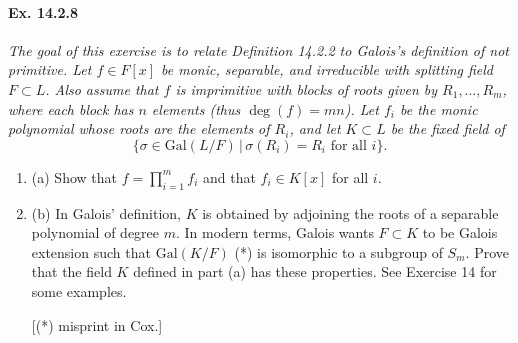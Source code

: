 \documentclass[11pt,a4paper]{article}
\newcommand{\be} {\begin{enumerate}}
\newcommand{\ee} {\end{enumerate}}
\newcommand{\Gal}{\mathrm{Gal}}
\begin{document}
\paragraph{Ex. 14.2.8}
{\it
The goal of this exercise is to relate Definition 14.2.2 to Galois's definition of not primitive. Let $f \in F[x]$ be monic, separable, and irreducible with splitting field $F \subset L$. Also assume that $f$ is imprimitive with blocks of roots given by $R_1,\ldots,R_m$, where each block has $n$ elements (thus $\deg(f) = mn$). Let $f_i$ be the monic polynomial whose roots are the elements of $R_i$, and let $K \subset L$ be the fixed field of $$\{\sigma \in \Gal(L/F)\, | \, \sigma(R_i) = R_i \text{ for all } i\}.$$
\be
\item[(a)] Show that $f = \prod_{i=1}^m f_i$ and that $f_i \in K[x]$ for all $i$.
\item[(b)] In Galois' definition, $K$ is obtained by adjoining the roots of a separable polynomial of degree $m$. In modern terms, Galois wants $F \subset K$ to be Galois extension such that $\Gal(K/F)$ (*) is isomorphic to a subgroup of $S_m$. Prove that the field $K$ defined in part (a) has these properties.
See Exercise 14 for some examples.

[(*) misprint in Cox.]
\ee
}
\end{document}
